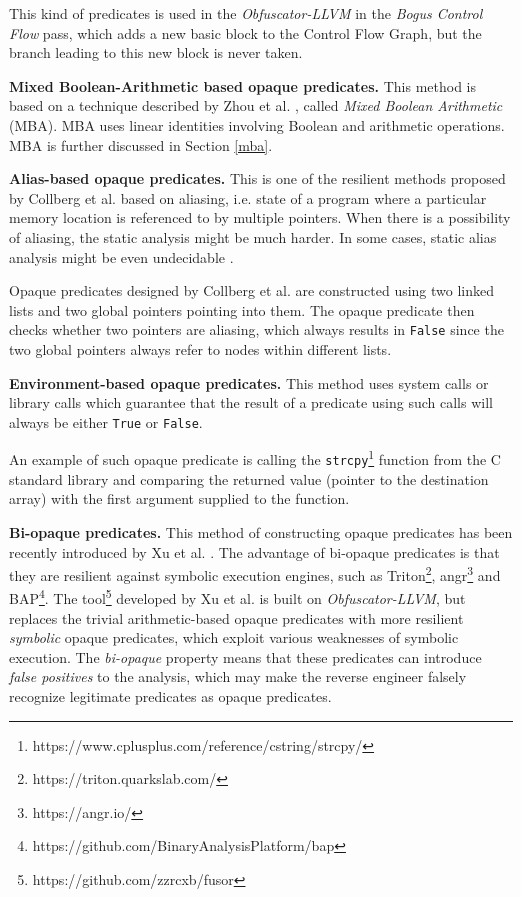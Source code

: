 \documentclass[
  digital, %
  notable,   %
  twoside, %
  nolof,     %
  nolot,     %
]{fithesis3}
\theoremstyle{definition}
\begin{document}
This kind of predicates is used in the \textit{Obfuscator-LLVM} in the \textit{Bogus Control Flow} pass, which adds a new basic block to the Control Flow Graph, but the branch leading to this new block is never taken. 

\textbf{Mixed Boolean-Arithmetic based opaque predicates.} This method is based on a technique described by Zhou et al. \cite{mba_zhou}, called \textit{Mixed Boolean Arithmetic} (MBA). 
MBA uses linear identities involving Boolean and arithmetic operations. MBA is further discussed in Section \ref{mba}.

\textbf{Alias-based opaque predicates.} This is one of the resilient methods proposed by Collberg et al. \cite{manufacturing_opaque} based on aliasing, i.e. state of a program where a particular memory location is referenced to by multiple pointers. When there is a possibility of aliasing, the static analysis might be much harder. In some cases, static alias analysis might be even undecidable \cite{aliasing_hard}.

Opaque predicates designed by Collberg et al. are constructed using two linked lists and two global pointers pointing into them. The opaque predicate then checks whether two pointers are aliasing, which always results in \texttt{False} since the two global pointers always refer to nodes within different lists. 

\textbf{Environment-based opaque predicates.}
This method uses system calls or library calls which guarantee that the result of a predicate using such calls will always be either \texttt{True} or \texttt{False}. 

An example of such opaque predicate is calling the \texttt{strcpy}\footnote{https://www.cplusplus.com/reference/cstring/strcpy/} function from the C standard library and comparing the returned value (pointer to the destination array) with the first argument supplied to the function.

\textbf{Bi-opaque predicates.} This method of constructing opaque predicates has been recently introduced by Xu et al. \cite{bi_opaque}. The advantage of bi-opaque predicates is that they are resilient against symbolic execution engines, such as Triton\footnote{https://triton.quarkslab.com/}, angr\footnote{https://angr.io/} and BAP\footnote{https://github.com/BinaryAnalysisPlatform/bap}. The tool\footnote{https://github.com/zzrcxb/fusor} developed by Xu et al. is built on \textit{Obfuscator-LLVM}, but replaces the trivial arithmetic-based opaque predicates with more resilient \textit{symbolic} opaque predicates, which exploit various weaknesses of symbolic execution. The \textit{bi-opaque} property means that these predicates can introduce \textit{false positives} to the analysis, which may make the reverse engineer falsely recognize legitimate predicates as opaque predicates.
\end{document}
